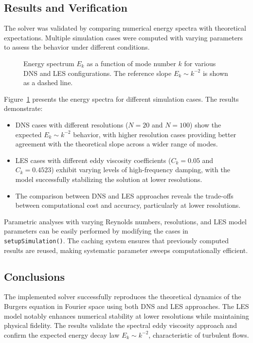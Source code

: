 \subsection{Results and Verification}
The solver was validated by comparing numerical energy spectra with theoretical expectations. Multiple simulation cases were computed with varying parameters to assess the behavior under different conditions.

\begin{figure}[h]
\centering
\caption{Energy spectrum $E_k$ as a function of mode number $k$ for various DNS and LES configurations. The reference slope $E_k \sim k^{-2}$ is shown as a dashed line.}
\label{fig:energy_spectrum}
\end{figure}

Figure~\ref{fig:energy_spectrum} presents the energy spectra for different simulation cases. The results demonstrate:

\begin{itemize}
\item DNS cases with different resolutions ($N = 20$ and $N = 100$) show the expected $E_k \sim k^{-2}$ behavior, with higher resolution cases providing better agreement with the theoretical slope across a wider range of modes.
\item LES cases with different eddy viscosity coefficients ($C_k = 0.05$ and $C_k = 0.4523$) exhibit varying levels of high-frequency damping, with the model successfully stabilizing the solution at lower resolutions.
\item The comparison between DNS and LES approaches reveals the trade-offs between computational cost and accuracy, particularly at lower resolutions.
\end{itemize}


Parametric analyses with varying Reynolds numbers, resolutions, and LES model parameters can be easily performed by modifying the cases in \texttt{setupSimulation()}. The caching system ensures that previously computed results are reused, making systematic parameter sweeps computationally efficient.

\subsection{Conclusions}
The implemented solver successfully reproduces the theoretical dynamics of the Burgers equation in Fourier space using both DNS and LES approaches. The LES model notably enhances numerical stability at lower resolutions while maintaining physical fidelity. The results validate the spectral eddy viscosity approach and confirm the expected energy decay law $E_k \sim k^{-2}$, characteristic of turbulent flows.

